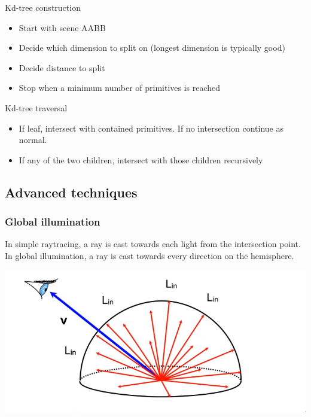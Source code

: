 \documentclass[12pt]{article}
\begin{document}
Kd-tree construction
\begin{itemize}
    \item Start with scene AABB
    \item Decide which dimension to split on (longest dimension is
        typically good)
    \item Decide distance to split
    \item Stop when a minimum number of primitives is reached
\end{itemize}

Kd-tree traversal
\begin{itemize}
    \item If leaf, intersect with contained primitives. If no intersection
        continue as normal.
    \item If any of the two children, intersect with those children recursively
\end{itemize}

\subsection{Advanced techniques}

\subsubsection{Global illumination}

In simple raytracing, a ray is cast towards each light from the
intersection point. In global illumination, a ray is cast towards
every direction on the hemisphere.

\includegraphics[scale=.5]{images/reflectance-equation.png}
\end{document}

